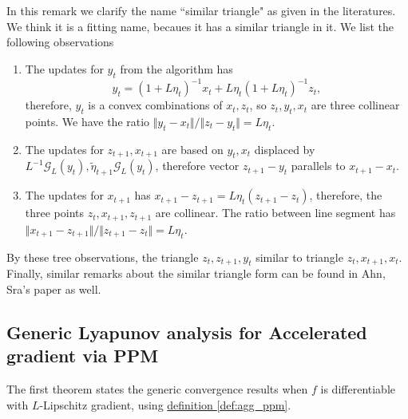 \documentclass[12pt]{article}
\begin{document}
            \begin{remark}
                In this remark we clarify the name ``similar triangle" as given in the literatures. 
                We think it is a fitting name, becaues it has a similar triangle in it. 
                We list the following observations
                \begin{enumerate}
                    \item 
                    The updates for $y_{t}$ from the algorithm has 
                    $$
                        y_t = (1 + L\eta_t)^{-1} x_t + L\eta_t(1 + L\eta_t)^{-1} z_t, 
                    $$
                    therefore, $y_t$ is a convex combinations of $x_t, z_t$, so $z_t, y_t, x_t$ are three collinear points. 
                    We have the ratio $\Vert y_t - x_t\Vert/\Vert z_t - y_t\Vert = L\eta_t$. 
                    \item 
                    The updates for $z_{t + 1}, x_{t + 1}$ are based on $y_t, x_t$ displaced by $L^{-1} \mathcal G_L(y_t), \tilde\eta_{t +1} \mathcal G_L(y_t)$, therefore vector $z_{t + 1} - y_t$ parallels to $x_{t + 1} - x_t$. 
                    \item The updates for $x_{t + 1}$ has $x_{t + 1} - z_{t + 1} = L\eta_t \left(z_{t + 1} - z_t\right)$, therefore, the three points $z_t, x_{t + 1}, z_{t + 1}$ are collinear. 
                    The ratio between line segment has $\Vert x_{t + 1} - z_{t + 1}\Vert/\Vert z_{t + 1} - z_t\Vert = L\eta_t$. 
                \end{enumerate}
                By these tree observations, the triangle $z_{t}, z_{t + 1}, y_t$ similar to triangle $z_t, x_{t + 1}, x_t$. 
                Finally, similar remarks about the similar triangle form can be found in Ahn, Sra's paper \cite{ahn_understanding_2022} as well. 
                
            \end{remark}
            

    \subsection{Generic Lyapunov analysis for Accelerated gradient via PPM}
    \label{sec:generic_ag_ppm_lyapunov_analysis}
        The first theorem states the generic convergence results when $f$ is differentiable with $L$-Lipschitz gradient, using \hyperref[def:agg_ppm]{definition \ref*{def:agg_ppm}}. 
\end{document}
